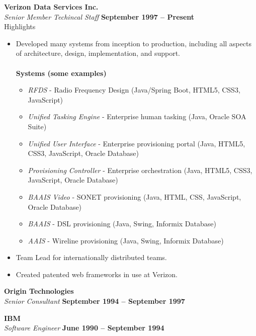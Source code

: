 \documentclass[margin,line]{resume}
\begin{document}
\begin{resume}
    \textbf{\listing Verizon Data Services Inc.} \vspace{2mm}\\\vspace{1mm}%
    \textsl{Senior Member Techincal Staff} \hfill \textbf{September 1997 -- Present}\\
    \textsf{\textmd{Highlights}}\\
    \begin{itemize}
    \item Developed many systems from inception to production, including all aspects of architecture, design, implementation, and support.\\\\
      \textbf{Systems \textmd{(some examples)}}
      \begin{itemize}
      \item \textsl{RFDS} - Radio Frequency Design \hfill (Java/Spring Boot, HTML5, CSS3, JavaScript)
      \item \textsl{Unified Tasking Engine} - Enterprise human tasking \hfill (Java, Oracle SOA Suite)
      \item \textsl{Unified User Interface} - Enterprise provisioning portal \hfill (Java, HTML5, CSS3, JavaScript, Oracle Database)
      \item \textsl{Provisioning Controller} - Enterprise orchestration \hfill (Java, HTML5, CSS3, JavaScript, Oracle Database)
      \item \textsl{BAAIS Video} - SONET provisioning \hfill (Java, HTML, CSS, JavaScript, Oracle Database)
      \item \textsl{BAAIS} - DSL provisioning \hfill (Java, Swing, Informix Database)
      \item \textsl{AAIS} - Wireline provisioning \hfill (Java, Swing, Informix Database)
      \end{itemize}
      \item Team Lead for internationally distributed teams.
      \item Created patented web frameworks in use at Verizon.
    \end{itemize}

    \textbf{\listing Origin Technologies} \vspace{2mm}\\\vspace{1mm}%
    \textsl{Senior Consultant} \hfill \textbf{September 1994 -- September 1997}
    

    \textbf{\listing IBM} \vspace{2mm}\\\vspace{1mm}%
    \textsl{Software Engineer} \hfill \textbf{June 1990 -- September 1994}\\
    


\end{resume}
\end{document}
